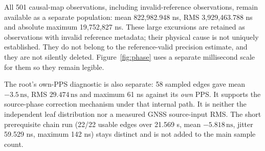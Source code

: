 \documentclass[11pt,letterpaper]{article}
\newcommand{\ns}{\,\mathrm{ns}}\newcommand{\us}{\,\mu\mathrm{s}}\newcommand{\ms}{\,\mathrm{ms}}\newcommand{\ppb}{\,\mathrm{ppb}}\newcommand{\code}[1]{\texttt{#1}}\newcolumntype{L}[1]{>{\RaggedRight\arraybackslash}p{#1}}
\begin{document}
All 501 causal-map observations, including invalid-reference observations, remain available as a separate population: mean 822,982.948 ns, RMS 3,929,463.788 ns and absolute maximum 19,752,827 ns. These large excursions are retained as observations with invalid reference metadata; their physical cause is not uniquely established. They do not belong to the reference-valid precision estimate, and they are not silently deleted. Figure~\ref{fig:phase} uses a separate millisecond scale for them so they remain legible.

The root's own-PPS diagnostic is also separate: 58 sampled edges gave mean $-3.5\ns$, RMS $29.474\ns$ and maximum 61 ns against its \emph{own} PPS. It supports the source-phase correction mechanism under that internal path. It is neither the independent leaf distribution nor a measured GNSS source-input RMS. The short prerequisite chain run (22/22 usable edges over 21.569 s, mean $-5.818\ns$, jitter 59.529 ns, maximum 142 ns) stays distinct and is not added to the main sample count.
\end{document}
